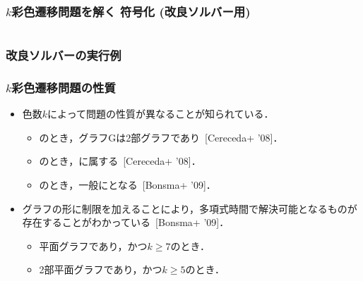 \begin{frame}[shrink]
  \frametitle{$k$彩色遷移問題を解く 符号化 {\small(改良ソルバー用)}}

\begin{columns}[t]
\begin{column}{0.9\linewidth}
\begin{exampleblock}{}
 
\end{exampleblock}    
\end{column}
\end{columns}
\end{frame}
\begin{frame}
  \frametitle{改良ソルバーの実行例}
\end{frame}
\begin{frame}\frametitle{$k$彩色遷移問題の性質}

  \begin{itemize}
    \item 色数$k$によって問題の性質が異なることが知られている．
    \begin{itemize}
      \item {}のとき，グラフGは2部グラフであり~[Cereceda+ '08]．
      \item {}のとき，に属する~[Cereceda+ '08]．
      \item {}のとき，一般にとなる~[Bonsma+ '09]．
    \end{itemize}

    \item グラフの形に制限を加えることにより，多項式時間で解決可能となるものが存在することがわかっている~[Bonsma+ '09]．
    \begin{itemize}
      \item 平面グラフであり，かつ$k \ge 7$のとき．
      \item 2部平面グラフであり，かつ$k \ge 5$のとき．
    \end{itemize}

  \end{itemize}
\end{frame}


